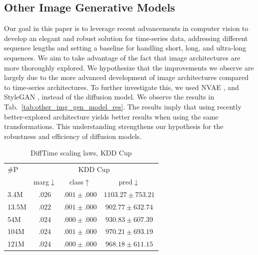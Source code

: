 \documentclass{article}
\begin{document}
\subsection{Other Image Generative Models}
Our goal in this paper is to leverage recent advancements in computer vision to develop an elegant and robust solution for time-series data, addressing different sequence lengths and setting a baseline for handling short, long, and ultra-long sequences. We aim to take advantage of the fact that image architectures are more thoroughly explored. We hypothesize that the improvements we observe are largely due to the more advanced development of image architectures compared to time-series architectures. To further investigate this, we used NVAE \cite{vahdat2020nvae}, and StyleGAN \cite{karras2019style}, instead of the diffusion model. We observe the results in Tab.~\ref{tab:other_img_gen_model_res}. The results imply that using recently better-explored architecture yields better results when using the same transformations. This understanding strengthens our hypothesis for the robustness and efficiency of diffusion models.

\begin{table}[!ht]
    \centering
    \caption{DiffTime scaling laws, KDD Cup}
    \setlength{\tabcolsep}{3.8pt}
    \label{tab:difftime_kdd_scaling_laws}
    \begin{tabular}{l|ccc}
        \toprule
        $\#$P & \multicolumn{3}{c}{KDD Cup} \\ 
        & marg$\downarrow$ & class$\uparrow$ & pred$\downarrow$ \\
        \midrule
        3.4M & $.026$ & $.001 \pm .000$ & $1103.27 \pm 753.21$ \\ 
        13.5M & $.022$ & $.001 \pm .000$ & $902.77 \pm 632.74$ \\ 
        54M & $.024$ & $.000 \pm .000$ & $930.83 \pm 607.39$ \\ 
        104M & $.024$ & $.001 \pm .000$ & $970.21 \pm 693.19$ \\ 
        121M & $.024$ & $.000 \pm .000$ & $968.18 \pm 611.15$ \\ 
        \bottomrule
    \end{tabular}
\end{table}
\end{document}
